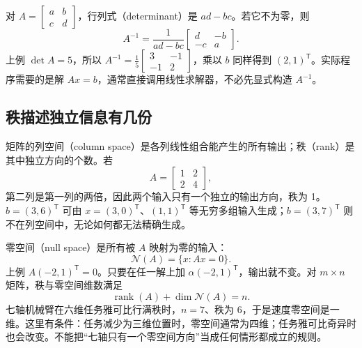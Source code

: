 对 $A=\begin{bmatrix}a&b\\c&d\end{bmatrix}$，行列式（determinant）是 $ad-bc$。若它不为零，则
\begin{equation}
 A^{-1}=\frac{1}{ad-bc}\begin{bmatrix}d&-b\\-c&a\end{bmatrix}.
\end{equation}
上例 $\det A=5$，所以 $A^{-1}=\frac15\begin{bmatrix}3&-1\\-1&2\end{bmatrix}$，乘以 $b$ 同样得到 $(2,1)^\mathsf T$。实际程序需要的是解 $Ax=b$，通常直接调用线性求解器，不必先显式构造 $A^{-1}$。

\subsection{秩描述独立信息有几份}
矩阵的列空间（column space）是各列线性组合能产生的所有输出；秩（rank）是其中独立方向的个数。若
\begin{equation}
 A=\begin{bmatrix}1&2\\2&4\end{bmatrix},
\end{equation}
第二列是第一列的两倍，因此两个输入只有一个独立的输出方向，秩为 1。$b=(3,6)^\mathsf T$ 可由 $x=(3,0)^\mathsf T$、$(1,1)^\mathsf T$ 等无穷多组输入生成；$b=(3,7)^\mathsf T$ 则不在列空间中，无论如何都无法精确生成。

零空间（null space）是所有被 $A$ 映射为零的输入：
\begin{equation}
 \mathcal N(A)=\{x:Ax=0\}.
\end{equation}
上例 $A(-2,1)^\mathsf T=0$。只要在任一解上加 $\alpha(-2,1)^\mathsf T$，输出就不变。对 $m\times n$ 矩阵，秩与零空间维数满足
\begin{equation}
 \operatorname{rank}(A)+\dim\mathcal N(A)=n.
\end{equation}
七轴机械臂在六维任务雅可比行满秩时，$n=7$、秩为 6，于是速度零空间是一维。这里有条件：任务减少为三维位置时，零空间通常为四维；任务雅可比奇异时也会改变。不能把“七轴只有一个零空间方向”当成任何情形都成立的规则。

